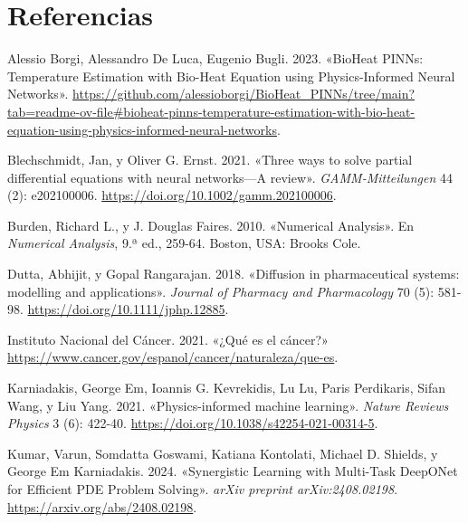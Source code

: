 \documentclass[
  spanish,
  us-letterpaper,
  DIV=11,
  numbers=noendperiod]{scrreprt}
\newlength{\cslhangindent}
\newenvironment{CSLReferences}[2] %
 {\begin{list}{}{%
  \setlength{\itemindent}{0pt}
  \setlength{\leftmargin}{0pt}
  \setlength{\parsep}{0pt}
  \ifodd #1
   \setlength{\leftmargin}{\cslhangindent}
   \setlength{\itemindent}{-1\cslhangindent}
  \fi
  \setlength{\itemsep}{#2\baselineskip}}}
 {\end{list}}
\theoremstyle{definition}
\theoremstyle{plain}
\theoremstyle{remark}
\begin{document}

\chapter*{Referencias}\label{referencias}


\label{refs}
\begin{CSLReferences}{1}{0}
Alessio Borgi, Alessandro De Luca, Eugenio Bugli. 2023. {«{BioHeat
PINNs: Temperature Estimation with Bio-Heat Equation using
Physics-Informed Neural Networks}»}.
\url{https://github.com/alessioborgi/BioHeat_PINNs/tree/main?tab=readme-ov-file\#bioheat-pinns-temperature-estimation-with-bio-heat-equation-using-physics-informed-neural-networks}.

Blechschmidt, Jan, y Oliver G. Ernst. 2021. {«Three ways to solve
partial differential equations with neural networks---A review»}.
\emph{GAMM-Mitteilungen} 44 (2): e202100006.
\url{https://doi.org/10.1002/gamm.202100006}.

Burden, Richard L., y J. Douglas Faires. 2010. {«Numerical Analysis»}.
En \emph{Numerical Analysis}, 9.ª ed., 259-64. Boston, USA: Brooks Cole.

Dutta, Abhijit, y Gopal Rangarajan. 2018. {«Diffusion in pharmaceutical
systems: modelling and applications»}. \emph{Journal of Pharmacy and
Pharmacology} 70 (5): 581-98. \url{https://doi.org/10.1111/jphp.12885}.

Instituto Nacional del Cáncer. 2021. {«{¿Qué es el cáncer?}»}
\url{https://www.cancer.gov/espanol/cancer/naturaleza/que-es}.

Karniadakis, George Em, Ioannis G. Kevrekidis, Lu Lu, Paris Perdikaris,
Sifan Wang, y Liu Yang. 2021. {«Physics-informed machine learning»}.
\emph{Nature Reviews Physics} 3 (6): 422-40.
\url{https://doi.org/10.1038/s42254-021-00314-5}.

Kumar, Varun, Somdatta Goswami, Katiana Kontolati, Michael D. Shields, y
George Em Karniadakis. 2024. {«Synergistic Learning with Multi-Task
DeepONet for Efficient PDE Problem Solving»}. \emph{arXiv preprint
arXiv:2408.02198}. \url{https://arxiv.org/abs/2408.02198}.


\end{CSLReferences}
\end{document}
